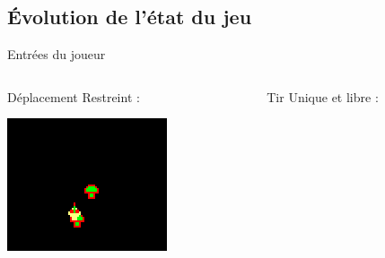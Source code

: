 \subsection{Évolution de l'état du jeu}
\begin{frame}{Entrées du joueur}
	\begin{columns}
		\begin{column}{0.4\textwidth}
			\begin{block}{Déplacement}
				Restreint :
				
				\smallskip
				\includegraphics[width=\textwidth]{imgs/collisionChampignon.png}
			\end{block}
		\end{column}
		\begin{column}{0.4\textwidth}
			\begin{block}{Tir}
				Unique et libre :
				

\end{block}
\end{column}
\end{columns}
\end{frame}

